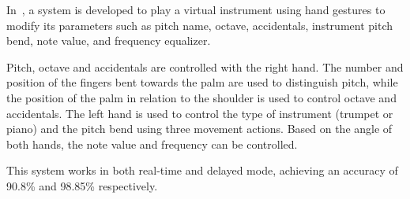 In~\cite{hand-gesture-controlled-music-instrument}, a system is developed to play a virtual instrument
using hand gestures to modify its parameters such as pitch name, octave, accidentals, instrument
pitch bend, note value, and frequency equalizer.

Pitch, octave and accidentals are controlled with the right hand.
The number and position of the fingers bent towards the palm are used to distinguish pitch, while
the position of the palm in relation to the shoulder is used to control octave and accidentals.
The left hand is used to control the type of instrument (trumpet or piano) and the pitch bend using three movement actions.
Based on the angle of both hands, the note value and frequency can be controlled.

This system works in both real-time and delayed mode, achieving an accuracy of 90.8\% and 98.85\% respectively.

